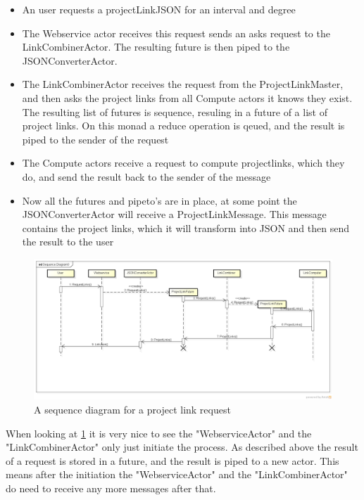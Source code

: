 \documentclass[10pt,a4paper]{article}
\begin{document}
\begin{itemize}
	\item{An user requests a projectLinkJSON for an interval and degree}
	\item{The Webservice actor receives this request sends an asks request to the LinkCombinerActor. The resulting future is then piped to the JSONConverterActor.}
	\item{The LinkCombinerActor receives the request from the ProjectLinkMaster, and then asks the project links from all Compute actors it knows they exist. The resulting list of futures is sequence, resuling in a future of a list of project links. On this monad a reduce operation is qeued, and the result is piped to the sender of the request}
	\item{The Compute actors receive a request to compute projectlinks, which they do, and send the result back to the sender of the message}
	\item{Now all the futures and pipeto's are in place, at some point the JSONConverterActor will receive a ProjectLinkMessage. This message contains the project links, which it will transform into JSON and then send the result to the user}
\end{itemize}

\begin{figure}[htb]
    \centering
    \includegraphics[width=1.0\textwidth]{ActorSequence}
    \caption{A sequence diagram for a project link request}
    \label{fig:actorSequence}
\end{figure}


When looking at \ref{fig:actorSequence} it is very nice to see the "WebserviceActor" and the "LinkCombinerActor" only just initiate the process. As described above the result of a request is stored in a future, and the result is piped to a new actor. This means after the initiation the "WebserviceActor" and the "LinkCombinerActor" do need to receive any more messages after that.
\end{document}
